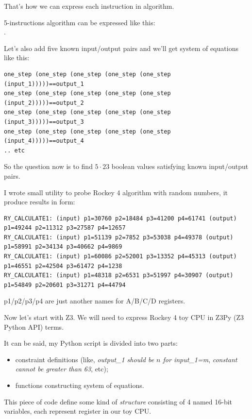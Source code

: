 That's how we can express each instruction in algorithm.

5-instructions algorithm can be expressed like this:\\
.

Let's also add five known input/output pairs and we'll get system of equations like this:

\begin{lstlisting}
one_step (one_step (one_step (one_step (one_step (input_1)))))==output_1
one_step (one_step (one_step (one_step (one_step (input_2)))))==output_2
one_step (one_step (one_step (one_step (one_step (input_3)))))==output_3
one_step (one_step (one_step (one_step (one_step (input_4)))))==output_4
.. etc
\end{lstlisting}

So the question now is to find $5 \cdot 23$ boolean values satisfying known input/output pairs.

I wrote small utility to probe Rockey 4 algorithm with random numbers, it produce results in form:

\begin{lstlisting}
RY_CALCULATE1: (input) p1=30760 p2=18484 p3=41200 p4=61741 (output) p1=49244 p2=11312 p3=27587 p4=12657
RY_CALCULATE1: (input) p1=51139 p2=7852 p3=53038 p4=49378 (output) p1=58991 p2=34134 p3=40662 p4=9869
RY_CALCULATE1: (input) p1=60086 p2=52001 p3=13352 p4=45313 (output) p1=46551 p2=42504 p3=61472 p4=1238
RY_CALCULATE1: (input) p1=48318 p2=6531 p3=51997 p4=30907 (output) p1=54849 p2=20601 p3=31271 p4=44794
\end{lstlisting}

p1/p2/p3/p4 are just another names for A/B/C/D registers.

Now let's start with Z3. We will need to express Rockey 4 toy CPU in Z3Py (Z3 Python \ac{API}) terms.

It can be said, my Python script is divided into two parts: 

\begin{itemize}
\item constraint definitions (like, \textit{output\_1 should be $n$ for input\_1=m},
\textit{constant cannot be greater than 63}, etc); 

\item functions constructing system of equations.
\end{itemize}

This piece of code define some kind of \textit{structure} consisting of 4 named 16-bit variables,
each represent register in our toy CPU.

